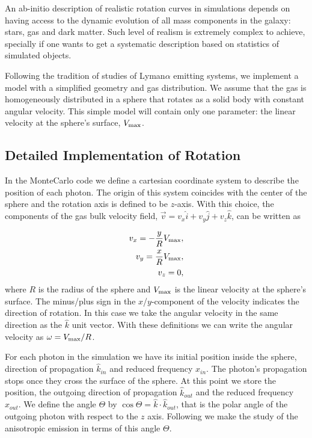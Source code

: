 \documentclass[usenatbib]{mn2e}
\begin{document}
An ab-initio description of realistic rotation curves in simulations
depends on having access to the dynamic evolution of all mass components
in the galaxy: stars, gas and dark matter. Such level of realism is
extremely complex to achieve, specially if one wants to get a
systematic description based on statistics of simulated objects.

Following the tradition of studies of Lyman$\alpha$ emitting systems,
we implement a model with a simplified geometry and gas
distribution. We assume that the gas is homogeneously distributed in a
sphere that rotates as a solid body with constant angular
velocity. This simple model will contain only one parameter: the
linear velocity at the sphere's surface, $V_{\rm max}$.

\subsection{Detailed Implementation of Rotation}

 In the MonteCarlo code we define a cartesian coordinate system to
 describe the position of each photon. The origin of this system
 coincides with the center of the sphere and the rotation axis is defined
 to be $z$-axis. With this choice, the components of the gas bulk velocity
 field, $\vec{v} = v_{x}\hat{i} + v_{y}\hat{j} + v_{z}\hat{k}$, can be
 written as  
  
\begin{subequations}
\begin{align}
    v_{x}=-\dfrac{y}{R}V_{\rm max}, \label{subeq1}\\
    v_{y}=\dfrac{x}{R}V_{\rm max}, \label{subeq2}\\
    v_{z}=0, \label{subeq3}
\end{align}
\end{subequations}
%
where $R$ is the radius of the sphere and $V_{\rm max}$ is the linear
velocity at the sphere's surface. The minus/plus sign in the
$x$/$y$-component of the velocity indicates the direction of
rotation. In this case we take the angular velocity in the same
direction as the $\hat{k}$ unit vector. With these definitions we can
write the angular velocity as $\omega=V_{\rm max}/R$.  


For each photon in the simulation we have its initial position inside
the sphere, direction of propagation $\hat{k}_{in}$ and reduced
frequency $x_{in}$. The photon's propagation stops once they cross the
surface of the sphere. At this point we store the position, the outgoing direction
of propagation $\hat{k}_{out}$ and the reduced frequency $x_{out}$. We
define the angle $\Theta$ by $\cos\Theta = \hat{k}\cdot
\hat{k}_{out}$, that is the polar angle of the outgoing photon with
respect to the $z$ axis. Following \cite{Zheng2013} we make the study
of the anisotropic emission in terms of this angle $\Theta$.
\end{document}
